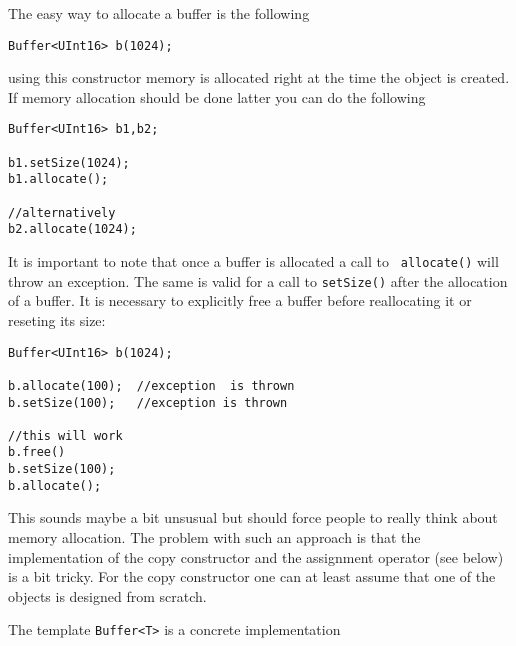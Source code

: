 The easy way to allocate a buffer is the following
\begin{verbatim}
Buffer<UInt16> b(1024);
\end{verbatim}
using this constructor memory is allocated right at the time the object is 
created. 
If memory allocation should be done latter you can do the following
\begin{verbatim}
Buffer<UInt16> b1,b2;

b1.setSize(1024);
b1.allocate();

//alternatively
b2.allocate(1024);
\end{verbatim}
It is important to note that once a buffer is allocated a call to {\tt
allocate()} will throw an exception. The same is valid for a call to 
{\tt setSize()} after the allocation of a buffer. 
It is necessary to explicitly free a buffer before reallocating it 
or reseting its size:
\begin{verbatim}
Buffer<UInt16> b(1024);

b.allocate(100);  //exception  is thrown
b.setSize(100);   //exception is thrown

//this will work
b.free()
b.setSize(100);
b.allocate();
\end{verbatim}
This sounds maybe a bit unsusual but should force people to really think 
about memory allocation. 
The problem with such an approach is that the implementation of the 
copy constructor and the assignment operator (see below) is a bit tricky. 
For the copy constructor one can at least assume that one of the objects
is designed from scratch. 




The template {\tt Buffer<T>} is a concrete implementation 
